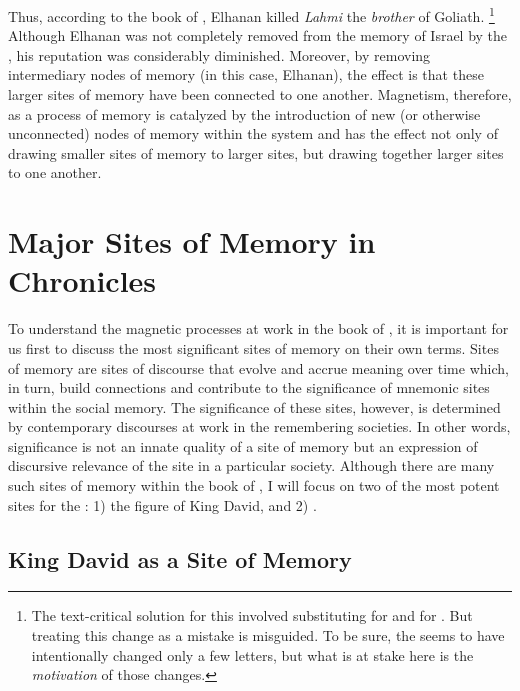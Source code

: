 \noindent
Thus, according to the book of \chronicles, Elhanan killed \emph{Lahmi} the \emph{brother} of Goliath.%
    \footnote{The text-critical solution for this involved substituting  for  and  for . But treating this change as a mistake is misguided. To be sure, the \chronicler seems to have intentionally changed only a few letters, but what is at stake here is the \emph{motivation} of those changes.}
Although Elhanan was not completely removed from the memory of Israel by the \chronicler, his reputation was considerably diminished. Moreover, by removing intermediary nodes of memory (in this case, Elhanan), the effect is that these larger sites of memory have been connected to one another. Magnetism, therefore, as a process of memory is catalyzed by the introduction of new (or otherwise unconnected) nodes of memory within the system and has the effect not only of drawing smaller sites of memory to larger sites, but drawing together larger sites to one another.


\section{Major Sites of Memory in Chronicles}

To understand the magnetic processes at work in the book of \chronicles, it is important for us first to discuss the most significant sites of memory on their own terms. Sites of memory are sites of discourse that evolve and accrue meaning over time which, in turn, build connections and contribute to the significance of mnemonic sites within the social memory. The significance of these sites, however, is determined by contemporary discourses at work in the remembering societies. In other words, significance is not an innate quality of a site of memory but an expression of discursive relevance of the site in a particular society. Although there are many such sites of memory within the book of \chronicles, I will focus on two of the most potent sites for the \chronicler: 1) the figure of King David, and 2) \solomonstemple.

\subsection{King David as a Site of Memory}

